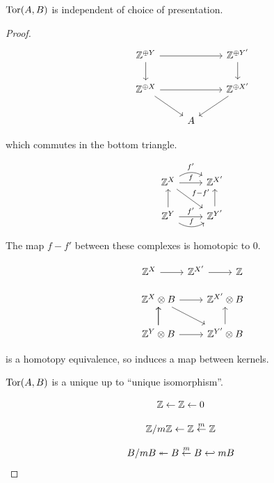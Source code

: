 \documentclass[11pt,leqno,oneside]{amsart}
\numberwithin{thm}{section}
\begin{document}
\begin{thm}
  $\operatorname{Tor}(A, B)$ is independent of choice of presentation.
\end{thm}
\begin{proof}
  $$\begin{tikzcd}
    & \Z^{\dsum Y} \arrow[rr, ""] \arrow[d, ""] &\, & \Z^{\dsum Y'} \arrow[d, ""] \\
    & \Z^{\dsum X} \arrow[rr, ""] \arrow[rd, ""] &\, & \Z^{\dsum X'} \arrow[dl, ""] \\
    &\, & A
  \end{tikzcd}$$

  which commutes in the bottom triangle.

  $$\begin{tikzcd}
    & \Z^X \arrow[r, "f"] \arrow[r, bend left, "f'"] \arrow[rd, "f-f'"] & \Z^{X'} \\
    & \Z^Y \arrow[r, bend right, "f"] \arrow[r, "f'"] \arrow[u, ""] & \Z^{Y'} \arrow[u, ""]
  \end{tikzcd}$$

  The map $f - f'$ between these complexes is homotopic to 0.

  $$\begin{tikzcd}
    & \Z^X \arrow[r, ""] & \Z^{X'} \arrow[r, ""] & \Z
  \end{tikzcd}$$

  $$\begin{tikzcd}
    & \Z^X \tprod B \arrow[r, ""] \arrow[rd, ""] & \Z^{X'} \tprod B \\
    & \Z^Y \tprod B \arrow[r, ""] \arrow[u, ""] \arrow[u, ""] & \Z^{Y'} \tprod B \arrow[u, ""]
  \end{tikzcd}$$

  is a homotopy equivalence, so induces a map between kernels.

  $\operatorname{Tor}(A, B)$ is a unique up to ``unique isomorphism''.

  $${\mathbb Z} \leftarrow {\mathbb Z} \leftarrow 0$$

  $${\mathbb Z}/m{\mathbb Z} \leftarrow {\mathbb Z} \overset{m}{\leftarrow} {\mathbb Z}$$

  $$B/mB \twoheadleftarrow B \overset{m}{\leftarrow} B \hookleftarrow mB$$
\end{proof}
\end{document}
